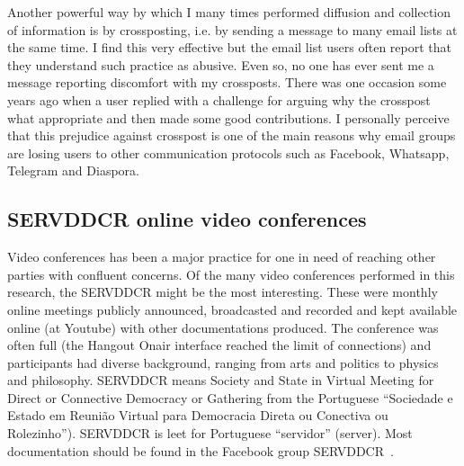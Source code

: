 \begin{apendicesenv}
Another powerful way by which I many times performed diffusion and collection
of information is by crossposting, i.e. by sending a message to many email lists
at the same time.
I find this very effective but the email list users often report that they understand such practice
as abusive.
Even so, no one has ever sent me a message reporting discomfort with my crossposts.
There was one occasion some years ago when a user replied with a challenge for
arguing why the crosspost what appropriate and then made some good contributions.
I personally perceive that this prejudice against crosspost is one of the main reasons
why email groups are losing users to other communication protocols such as Facebook, Whatsapp, Telegram and Diaspora.

\subsection{SERVDDCR online video conferences}\label{sec:serv}
Video conferences has been a major practice for one in need of reaching other parties with confluent concerns.
Of the many video conferences performed in this research,
the SERVDDCR might be the most interesting.
These were monthly online meetings publicly announced, broadcasted and
recorded and kept available online (at Youtube) with other documentations produced.
The conference was often full (the Hangout Onair interface reached the limit of connections)
and participants had diverse background, ranging from arts and politics to physics and philosophy.
SERVDDCR means Society and State in Virtual Meeting for Direct or Connective Democracy or Gathering
from the Portuguese ``Sociedade e Estado em Reunião Virtual para Democracia Direta ou Conectiva ou Rolezinho'').
SERVDDCR is leet for Portuguese ``servidor'' (server).
Most documentation should be found in the Facebook group SERVDDCR~\cite{servidor}.


\end{apendicesenv}
